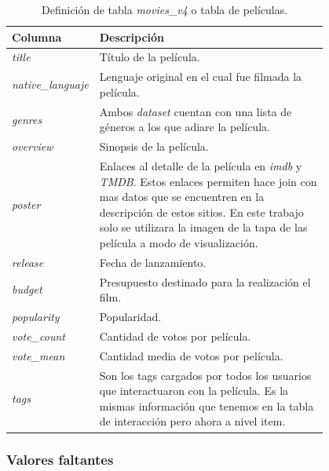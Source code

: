 \documentclass[11pt,a4paper,twoside]{thesis}
\begin{document}
\begin{table}[!htb]
	\centering
	\footnotesize
	\begin{tabular}{l | p{0.8\linewidth}}
	\hline
		Columna       & Descripción \\
	\hline

	\textit{title}             	& Título de la película. \\
	\textit{native\_languaje} 	& Lenguaje original en el cual fue filmada la película. \\
	\textit{genres}				& Ambos \textit{dataset} cuentan con una lista de géneros a los que adiare la película. \\
	\textit{overview}			& Sinopsis de la película. \\
	\textit{poster} 			& Enlaces al detalle de la película en \textit{imdb} y \textit{TMDB}. Estos enlaces
									permiten hace join con mas datos que se encuentren en la descripción de estos
			 						sitios. En este trabajo solo se utilizara la imagen de la tapa de las película
									a modo de visualización. \\
	\textit{release}  			& Fecha de lanzamiento. \\
	\textit{budget}  			& Presupuesto destinado para la realización el film. \\
	\textit{popularity}  		& Popularidad. \\
	\textit{vote\_count}  		& Cantidad de votos por película. \\
	\textit{vote\_mean}  		& Cantidad media de votos por película. \\
	\textit{tags}  				& Son los tags cargados por todos los usuarios que interactuaron con la película. 
									Es la mismas información que tenemos en la tabla de interacción pero ahora a nivel item. \\

	\hline
	\end{tabular}
	\caption{
		Definición de tabla \textit{movies\_v4} o tabla de películas.
	}
	\label{table:moviesTableDef}
\end{table}



\subsubsection*{Valores faltantes}
\end{document}
